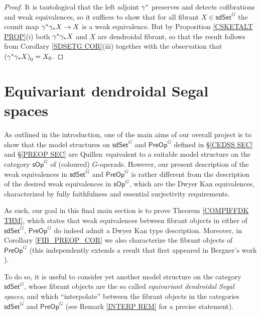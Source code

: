 \documentclass[a4paper,10pt
 ,draft
]{article}%
\begin{document}
\begin{proof}
	It is tautological that the left adjoint $\gamma^{\**}$
	preserves and detects cofibrations and weak equivalences,
	so it suffices to show that for all fibrant
	$X \in \mathsf{sdSet}^G$
	the counit map 
	$\gamma^{\**} \gamma_{\**} X \to X$
	is a weak equivalence. 
	But by
	Proposition \ref{CSKETALT PROP}(i) both
	$\gamma^{\**} \gamma_{\**} X$ and $X$
	are dendroidal fibrant, 
	so that the result follows from 
	Corollary \ref{SDSETG COR}(iii) together with the observation that $\left(\gamma^{\**} \gamma_{\**} X\right)_0 = X_0$.
\end{proof}



\section{Equivariant dendroidal Segal spaces}
\label{EDSS_SEC}

As outlined in the introduction, one of the main aims of our overall project is to show that the model structures on 
$\mathsf{sdSet}^G$ and $\mathsf{PreOp}^G$
defined in \S \ref{CEDSS SEC} and \S \ref{PREOP SEC}
are Quillen\ equivalent to a suitable model structure on the category 
$\mathsf{sOp}^G$ of (coloured) $G$-operads.
However, our present description of the weak equivalences in 
$\mathsf{sdSet}^G$ and $\mathsf{PreOp}^G$
is rather different from the description of the desired weak equivalences in $\mathsf{sOp}^G$,
which are the Dwyer Kan equivalences, 
characterized by fully faithfulness and essential surjectivity requirements.

As such, our goal in this final main section is to prove
Theorem \ref{COMPIFFDK THM},
which states that weak equivalences between fibrant objects in either of 
$\mathsf{sdSet}^G$, $\mathsf{PreOp}^G$
do indeed admit a Dwyer Kan type description.
Moreover, in Corollary \ref{FIB_PREOP_COR} we also characterize the fibrant objects
of $\mathsf{PreOp}^G$
(this independently extends a result that first appeared in Bergner's work \cite{Ber07}).

To do so, it is useful to consider yet another model structure on the category $\mathsf{sdSet}^G$,
whose fibrant objects are the so called
\textit{equivariant dendroidal Segal spaces},
and which ``interpolate''
between the fibrant objects 
in the categories $\mathsf{sdSet}^G$ and $\mathsf{PreOp}^G$ (see Remark \ref{INTERP REM} for a precise statement).
\end{document}
